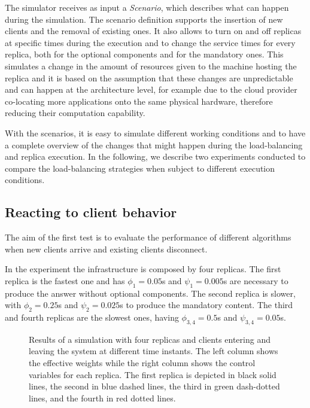 The simulator receives as input a \emph{Scenario}, which describes
what can happen during the simulation. The scenario definition
supports the insertion of new clients and the removal of existing
ones. It also allows to turn on and off replicas at specific times
during the execution and to change the service times for every
replica, both for the optional components and for the mandatory
ones. This simulates a change in the amount of resources given to the
machine hosting the replica and it is based on the assumption that
these changes are unpredictable and can happen at the architecture
level, for example due to the cloud provider co-locating more
applications onto the same physical hardware, therefore reducing their
computation capability.

With the scenarios, it is easy to simulate different working
conditions and to have a complete overview of the changes that might
happen during the load-balancing and replica execution. In the
following, we describe two experiments conducted to compare the
load-balancing strategies when subject to different execution
conditions.

\subsection{Reacting to client behavior}

The aim of the first test is to evaluate the performance of different
algorithms when new clients arrive and existing clients disconnect.

In the experiment the infrastructure is composed by four replicas. The
first replica is the fastest one and has $\phi_1 = 0.05$s and $\psi_1
= 0.005$s are necessary to produce the answer without optional
components. The second replica is slower, with $\phi_2 = 0.25$s and
$\psi_2 = 0.025$s to produce the mandatory content. The third and
fourth replicas are the slowest ones, having $\phi_{3,4} = 0.5$s and
$\psi_{3,4} = 0.05$s.

\begin{figure}
  \centering 
  \caption{Results of a simulation with four replicas and clients
    entering and leaving the system at different time instants. The
    left column shows the effective weights while the right column
    shows the control variables for each replica. The first replica is
    depicted in black solid lines, the second in blue dashed lines,
    the third in green dash-dotted lines, and the fourth in red dotted
    lines.}
\label{fig:clientchanges-full}
\end{figure}

